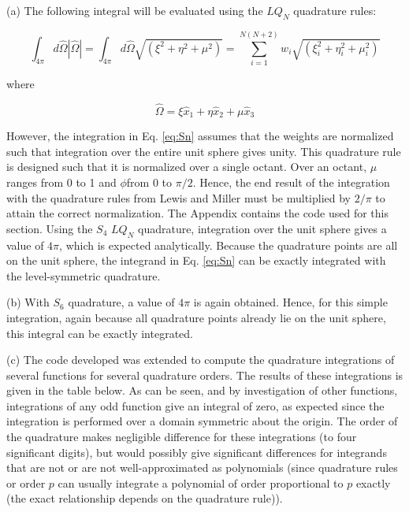 \documentclass[10pt]{article}
\newcommand*\circled[1]{\tikz[baseline=(char.base)]{
            \node[shape=circle,draw,inner sep=2pt] (char) {#1};}}
\begin{document}
\circled{2} (a) The following integral will be evaluated using the \(LQ_N\) quadrature rules:

\begin{equation}
\label{eq:Sn}
\int_{4\pi}^{}d\hat{\Omega}|\hat{\Omega}|=\int_{4\pi}^{}d\hat{\Omega}\sqrt{(\xi^2+\eta^2+\mu^2)}=\sum_{i=1}^{N(N+2)}w_i\sqrt{(\xi_i^2+\eta_i^2+\mu_i^2)}
\end{equation}

where

\begin{equation}
\hat{\Omega}=\xi\hat{x}_1+\eta\hat{x}_2+\mu\hat{x}_3
\end{equation}

However, the integration in Eq. \eqref{eq:Sn} assumes that the weights are normalized such that integration over the entire unit sphere gives unity. This quadrature rule is designed such that it is normalized over a single octant. Over an octant, \(\mu\) ranges from 0 to 1 and \(\phi\)from 0 to \(\pi/2\). Hence, the end result of the integration with the quadrature rules from Lewis and Miller must be multiplied by \(2/\pi\) to attain the correct normalization. The Appendix contains the code used for this section. Using the \(S_4\) \(LQ_N\) quadrature, integration over the unit sphere gives a value of \(4\pi\), which is expected analytically. Because the quadrature points are all on the unit sphere, the integrand in Eq. \eqref{eq:Sn} can be exactly integrated with the level-symmetric quadrature.\newline

(b) With \(S_6\) quadrature, a value of \(4\pi\) is again obtained. Hence, for this simple integration, again because all quadrature points already lie on the unit sphere, this integral can be exactly integrated.\newline

(c) The code developed was extended to compute the quadrature integrations of several functions for several quadrature orders. The results of these integrations is given in the table below. As can be seen, and by investigation of other functions, integrations of any odd function give an integral of zero, as expected since the integration is performed over a domain symmetric about the origin. The order of the quadrature makes negligible difference for these integrations (to four significant digits), but would possibly give significant differences for integrands that are not or are not well-approximated as polynomials (since quadrature rules or order \(p\) can usually integrate a polynomial of order proportional to \(p\) exactly (the exact relationship depends on the quadrature rule)).
\end{document}
